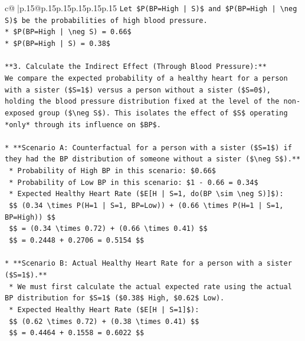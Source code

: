 \documentclass{article}
\begin{document}
{\begin{supertabular}{c@{$\;$}|p{.15\linewidth}@{}p{.15\linewidth}p{.15\linewidth}p{.15\linewidth}p{.15\linewidth}p{.15\linewidth}}
{{{\texttt{Let \$P(BP=High | S)\$ and \$P(BP=High | \textbackslash{}neg S)\$ be the probabilities of high blood pressure.} \\
\texttt{*   \$P(BP=High | \textbackslash{}neg S) = 0.66\$} \\
\texttt{*   \$P(BP=High | S) = 0.38\$} \\
\\ 
\texttt{**3. Calculate the Indirect Effect (Through Blood Pressure):**} \\
\texttt{We compare the expected probability of a healthy heart for a person with a sister (\$S=1\$) versus a person without a sister (\$S=0\$), holding the blood pressure distribution fixed at the level of the non{-}exposed group (\$\textbackslash{}neg S\$). This isolates the effect of \$S\$ operating *only* through its influence on \$BP\$.} \\
\\ 
\texttt{*   **Scenario A: Counterfactual for a person with a sister (\$S=1\$) if they had the BP distribution of someone without a sister (\$\textbackslash{}neg S\$).**} \\
\texttt{    *   Probability of High BP in this scenario: \$0.66\$} \\
\texttt{    *   Probability of Low BP in this scenario: \$1 {-} 0.66 = 0.34\$} \\
\texttt{    *   Expected Healthy Heart Rate (\$E{[}H | S=1, do(BP \textbackslash{}sim \textbackslash{}neg S){]}\$):} \\
\texttt{        \$\$ (0.34 \textbackslash{}times P(H=1 | S=1, BP=Low)) + (0.66 \textbackslash{}times P(H=1 | S=1, BP=High)) \$\$} \\
\texttt{        \$\$ = (0.34 \textbackslash{}times 0.72) + (0.66 \textbackslash{}times 0.41) \$\$} \\
\texttt{        \$\$ = 0.2448 + 0.2706 = 0.5154 \$\$} \\
\\ 
\texttt{*   **Scenario B: Actual Healthy Heart Rate for a person with a sister (\$S=1\$).**} \\
\texttt{    *   We must first calculate the actual expected rate using the actual BP distribution for \$S=1\$ (\$0.38\$ High, \$0.62\$ Low).} \\
\texttt{    *   Expected Healthy Heart Rate (\$E{[}H | S=1{]}\$):} \\
\texttt{        \$\$ (0.62 \textbackslash{}times 0.72) + (0.38 \textbackslash{}times 0.41) \$\$} \\
\texttt{        \$\$ = 0.4464 + 0.1558 = 0.6022 \$\$} \\
}}}
\end{supertabular}}
\end{document}

